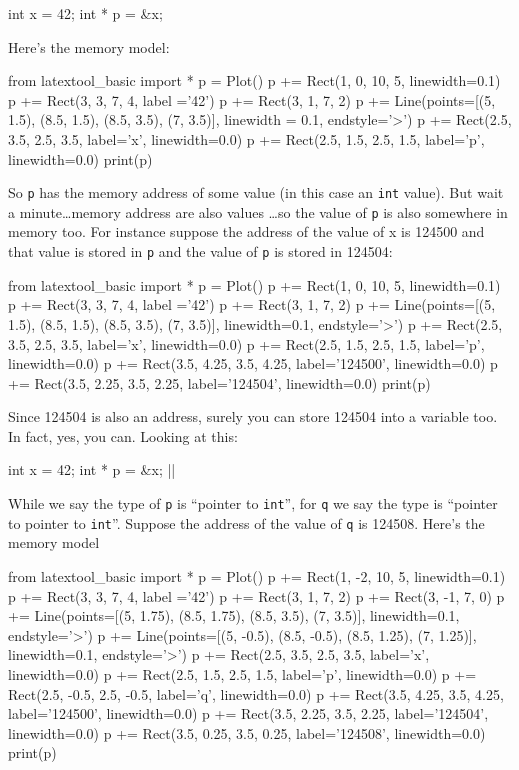 \begin{consolethree}[escapeinside=||]
int x = 42;
int * p = &x;
\end{consolethree}
Here's the memory model:

\begin{python}
from latextool_basic import *
p = Plot()
p += Rect(1, 0, 10, 5, linewidth=0.1)
p += Rect(3, 3, 7, 4, label ='42')
p += Rect(3, 1, 7, 2)
p += Line(points=[(5, 1.5), (8.5, 1.5), (8.5, 3.5), (7, 3.5)], linewidth = 0.1, endstyle='>')
p += Rect(2.5, 3.5, 2.5, 3.5, label='x', linewidth=0.0)
p += Rect(2.5, 1.5, 2.5, 1.5, label='p', linewidth=0.0)
print(p)
\end{python}

So \texttt{p} has the memory address of some value (in this case an \texttt{int} value). But wait a minute\ldots memory address are also values \ldots so the value of \texttt{p} is also somewhere in memory too. For instance suppose the address of the value of x is 124500 and that value is stored in \texttt{p} and the value of \texttt{p} is stored in 124504:

\begin{python}
from latextool_basic import *
p = Plot()
p += Rect(1, 0, 10, 5, linewidth=0.1)
p += Rect(3, 3, 7, 4, label ='42')
p += Rect(3, 1, 7, 2)
p += Line(points=[(5, 1.5), (8.5, 1.5), (8.5, 3.5), (7, 3.5)], linewidth=0.1, endstyle='>')
p += Rect(2.5, 3.5, 2.5, 3.5, label='x', linewidth=0.0)
p += Rect(2.5, 1.5, 2.5, 1.5, label='p', linewidth=0.0)
p += Rect(3.5, 4.25, 3.5, 4.25, label='124500', linewidth=0.0)
p += Rect(3.5, 2.25, 3.5, 2.25, label='124504', linewidth=0.0)
print(p)
\end{python}

Since 124504 is also an address, surely you can store 124504 into a variable too. In fact, yes, you can. Looking at this:

\begin{consolethree}[escapeinside=||]
int x = 42;
int * p = &x;
||
\end{consolethree}
While we say the type of \texttt{p} is ``pointer to \texttt{int}'', for \texttt{q} we say the type is ``pointer to pointer to \texttt{int}''. Suppose the address of the value of \texttt{q} is 124508. Here's the memory model

\begin{python}
from latextool_basic import *
p = Plot()
p += Rect(1, -2, 10, 5, linewidth=0.1)
p += Rect(3, 3, 7, 4, label ='42')
p += Rect(3, 1, 7, 2)
p += Rect(3, -1, 7, 0)
p += Line(points=[(5, 1.75), (8.5, 1.75), (8.5, 3.5), (7, 3.5)], linewidth=0.1, endstyle='>')
p += Line(points=[(5, -0.5), (8.5, -0.5), (8.5, 1.25), (7, 1.25)], linewidth=0.1, endstyle='>')
p += Rect(2.5, 3.5, 2.5, 3.5, label='x', linewidth=0.0)
p += Rect(2.5, 1.5, 2.5, 1.5, label='p', linewidth=0.0)
p += Rect(2.5, -0.5, 2.5, -0.5, label='q', linewidth=0.0)
p += Rect(3.5, 4.25, 3.5, 4.25, label='124500', linewidth=0.0)
p += Rect(3.5, 2.25, 3.5, 2.25, label='124504', linewidth=0.0)
p += Rect(3.5, 0.25, 3.5, 0.25, label='124508', linewidth=0.0)
print(p)
\end{python}

